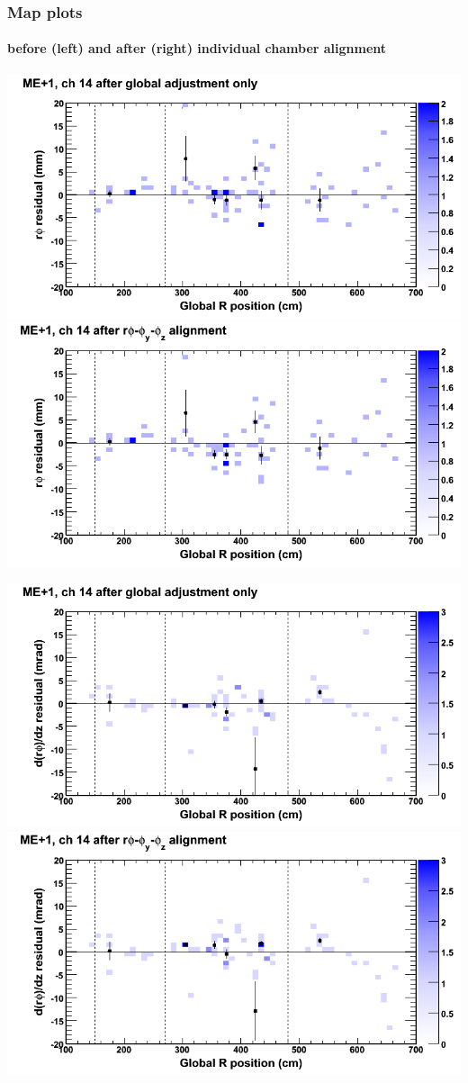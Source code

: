 \documentclass[compress]{beamer}
\begin{document}
\begin{frame}
\frametitle{Map plots}
\framesubtitle{before (left) and after (right) individual chamber alignment}
\includegraphics[width=0.5\linewidth]{ringmapplots_3dof/before_CSCvsr_mep1ch14_x.png} \includegraphics[width=0.5\linewidth]{ringmapplots_3dof/after_CSCvsr_mep1ch14_x.png}

\includegraphics[width=0.5\linewidth]{ringmapplots_3dof/before_CSCvsr_mep1ch14_dxdz.png} \includegraphics[width=0.5\linewidth]{ringmapplots_3dof/after_CSCvsr_mep1ch14_dxdz.png}
\end{frame}
\end{document}
